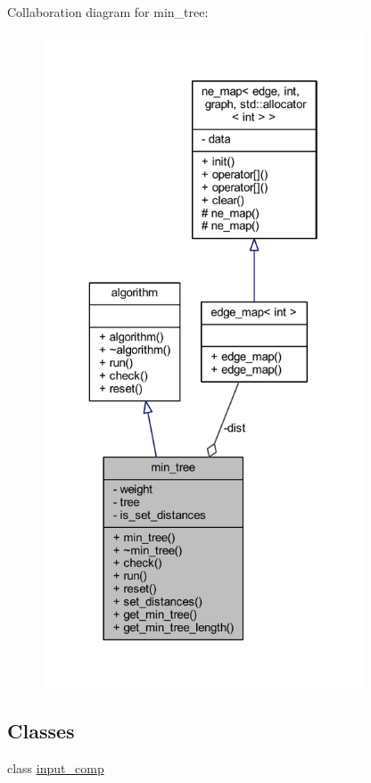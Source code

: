 Collaboration diagram for min\+\_\+tree\+:\nopagebreak
\begin{figure}[H]
\begin{center}
\leavevmode
\includegraphics[height=550pt]{classmin__tree__coll__graph}
\end{center}
\end{figure}
\subsection*{Classes}
\begin{DoxyCompactItemize}
\item 
class \mbox{\hyperlink{classmin__tree_1_1input__comp}{input\+\_\+comp}}
\end{DoxyCompactItemize}
